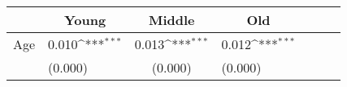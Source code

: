 {
\def\sym#1{\ifmmode^{#1}\else\(^{#1}\)\fi}
\begin{tabular*}{.6\hsize}{@{\hskip\tabcolsep\extracolsep\fill}l*{3}{lc}}
\toprule
                &\multicolumn{1}{c}{Young}&\multicolumn{1}{c}{Middle}&\multicolumn{1}{c}{Old}\\
\midrule
Age \hspace{2ex}&    0.010\sym{***}&    0.013\sym{***}&    0.012\sym{***}\\
                &  (0.000)         &  (0.000)         &  (0.000)         \\
\bottomrule
\end{tabular*}
}

